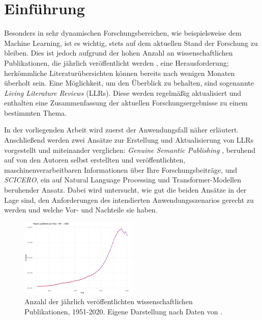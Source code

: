 \section{Einführung}
\label{sec:einfuehrung}

Besonders in sehr dynamischen Forschungsbereichen, wie beispielsweise dem Machine Learning, ist es wichtig, stets auf dem aktuellen Stand der Forschung zu bleiben.
Dies ist jedoch aufgrund der hohen Anzahl an wissenschaftlichen Publikationen, die jährlich veröffentlicht werden \cite{scientific-growth}, eine Herausforderung; herkömmliche Literaturübersichten können bereits nach wenigen Monaten überholt sein.
Eine Möglichkeit, um den Überblick zu behalten, sind sogenannte \textit{Living Literature Reviews} (LLRs).
Diese werden regelmäßig aktualisiert und enthalten eine Zusammenfassung der aktuellen Forschungsergebnisse zu einem bestimmten Thema.

In der vorliegenden Arbeit wird zuerst der Anwendungsfall näher erläutert.
Anschließend werden zwei Ansätze zur Erstellung und Aktualisierung von LLRs vorgestellt und miteinander verglichen:
\textit{Genuine Semantic Publishing} \cite{kuhn2017genuine}, beruhend auf von den Autoren selbst erstellten und veröffentlichten, maschinenverarbeitbaren Informationen über Ihre Forschungsbeiträge, und \textit{SCICERO}, ein auf Natural Language Processing und Transformer-Modellen beruhender Ansatz.
Dabei wird untersucht, wie gut die beiden Ansätze in der Lage sind, den Anforderungen des intendierten Anwendungsszenarios gerecht zu werden und welche Vor- und Nachteile sie haben.

\begin{figure}[bhp]
    \centering
    \includegraphics[width=0.5\textwidth]{figures/papers-per-year.pdf}
    \caption{Anzahl der jährlich veröffentlichten wissenschaftlichen Publikationen, 1951-2020. Eigene Darstellung nach Daten von \citet{papers-per-year}.}
    \label{fig:overview}
\end{figure}
